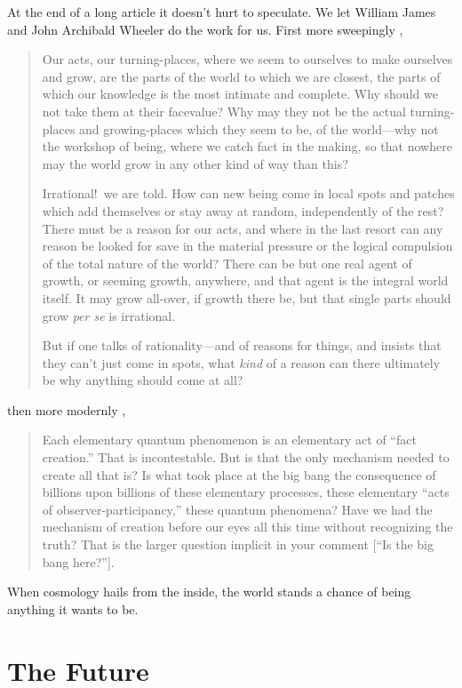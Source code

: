 At the end of a long article it doesn't hurt to speculate.  We let William James and John Archibald Wheeler do the work for us.  First more sweepingly \cite{James22},
\begin{quotation}\small
Our acts, our turning-places, where we seem to ourselves to
make ourselves and grow, are the parts of the world to which we are
closest, the parts of which our knowledge is the most intimate and
complete. Why should we not take them at their facevalue? Why may
they not be the actual turning-places and growing-places which they
seem to be, of the world---why not the workshop of being, where we
catch fact in the making, so that nowhere may the world grow in any
other kind of way than this?

Irrational!\ we are told. How can new being come in local spots and
patches which add themselves or stay away at random, independently of
the rest? There must be a reason for our acts, and where in the last
resort can any reason be looked for save in the material pressure or
the logical compulsion of the total nature of the world? There can be
but one real agent of growth, or seeming growth, anywhere, and that
agent is the integral world itself. It may grow all-over, if growth
there be, but that single parts should grow {\it per se\/} is
irrational.

But if one talks of rationality---and of reasons for things, and
insists that they can't just come in spots, what {\it kind\/} of a
reason can there ultimately be why anything should come at all?
\end{quotation}
then more modernly \cite{Wheeler82},
\begin{quotation}\small
Each elementary quantum phenomenon is an elementary act of ``fact
creation.'' That is incontestable. But is that the only mechanism
needed to create all that is? Is what took place at the big bang the
consequence of billions upon billions of these elementary processes,
these elementary ``acts of observer-participancy,'' these quantum
phenomena? Have we had the mechanism of creation before our eyes all
this time without recognizing the truth? That is the larger question
implicit in your comment [``Is the big bang here?''].
\end{quotation}
When cosmology hails from the inside, the world stands a chance of being anything it wants to be.

\section{The Future}

